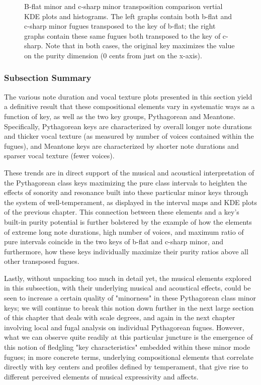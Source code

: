 \begin{figure}[H]
    \begin{center}
    \caption[B-flat minor and c-sharp minor transposition comparison vertial KDE plots and histograms. ]{B-flat minor and c-sharp minor transposition comparison vertial KDE plots and histograms. The left graphs contain both b-flat and c-sharp minor fugues transposed to the key of b-flat; the right graphs contain these same fugues both transposed to the key of c-sharp. Note that in both cases, the original key maximizes the value on the purity dimension (0 cents from just on the x-axis).}
    \end{center}
\end{figure}
    
    \subsubsection{Subsection Summary}\label{subsection-summary}

The various note duration and vocal texture plots presented in this
section yield a definitive result that these compositional elements vary
in systematic ways as a function of key, as well as the two key groups,
Pythagorean and Meantone. Specifically, Pythagorean keys are
characterized by overall longer note durations and thicker vocal texture
(as measured by number of voices contained within the fugues), and
Meantone keys are characterized by shorter note durations and sparser
vocal texture (fewer voices).

These trends are in direct support of the musical and acoustical
interpretation of the Pythagorean class keys maximizing the pure class
intervals to heighten the effects of sonority and resonance built into
these particular minor keys through the system of well-temperament, as
displayed in the interval maps and KDE plots of the previous chapter.
This connection between these elements and a key's built-in purity
potential is further bolstered by the example of how the elements of
extreme long note durations, high number of voices, and maximum ratio of
pure intervals coincide in the two keys of b-flat and c-sharp minor, and
furthermore, how these keys individually maximize their purity ratios
above all other transposed fugues.

Lastly, without unpacking too much in detail yet, the musical elements
explored in this subsection, with their underlying musical and
acoustical effects, could be seen to increase a certain quality of
"minorness" in these Pythagorean class minor keys; we will continue to
break this notion down further in the next large section of this chapter
that deals with scale degrees, and again in the next chapter involving
local and fugal analysis on individual Pythagorean fugues. However, what
we can observe quite readily at this particular juncture is the
emergence of this notion of fledgling "key characteristics" embedded
within these minor mode fugues; in more concrete terms, underlying
compositional elements that correlate directly with key centers and
profiles defined by temperament, that give rise to different perceived
elements of musical expressivity and affects.

